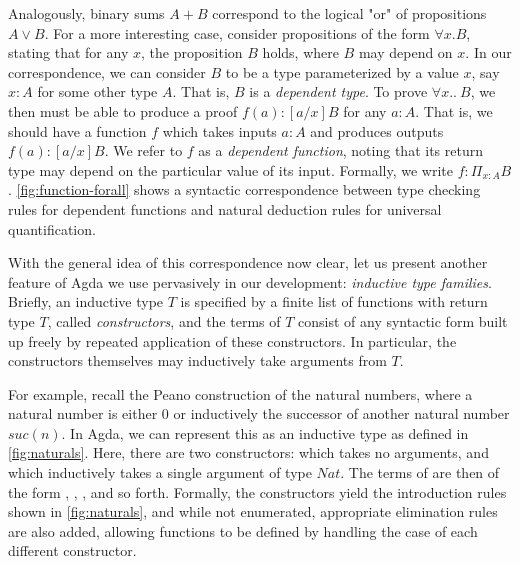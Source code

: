 Analogously, binary sums $A + B$ correspond to the logical "or" of propositions $A \lor B$. For a more interesting case, consider propositions of the form $\forall x. B$, stating that for any $x$, the proposition $B$ holds, where $B$ may depend on $x$. In our correspondence, we can consider $B$ to be a type parameterized by a value $x$, say $x : A$ for some other type $A$. That is, $B$ is a \emph{dependent type}. To prove $\forall x..~ B$, we then must be able to produce a proof $f(a) : [a / x]B$ for any $a : A$. That is, we should have a function $f$ which takes inputs $a : A$ and produces outputs $f(a) : [a / x]B$. We refer to $f$ as a \emph{dependent function}, noting that its return type may depend on the particular value of its input. Formally, we write $f : \Pi_{x : A} B$. \autoref{fig:function-forall} shows a syntactic correspondence between type checking rules for dependent functions and natural deduction rules for universal quantification. 



With the general idea of this correspondence now clear, let us present another feature of Agda we use pervasively in our development: \emph{inductive type families}. Briefly, an inductive type $T$ is specified by a finite list of functions with return type $T$, called \emph{constructors}, and the terms of $T$ consist of any syntactic form built up freely by repeated application of these constructors. In particular, the constructors themselves may inductively take arguments from $T$.

For example, recall the Peano construction of the natural numbers, where a natural number is either $0$ or inductively the successor of another natural number $suc(n)$. In Agda, we can represent this as an inductive type  as defined in \autoref{fig:naturals}. Here, there are two constructors:  which takes no arguments, and  which inductively takes a single argument of type $Nat$. The terms of  are then of the form ,\; ,\; , and so forth. Formally, the constructors yield the introduction rules shown in \autoref{fig:naturals}, and while not enumerated, appropriate elimination rules are also added, allowing functions to be defined by handling the case of each different constructor.



